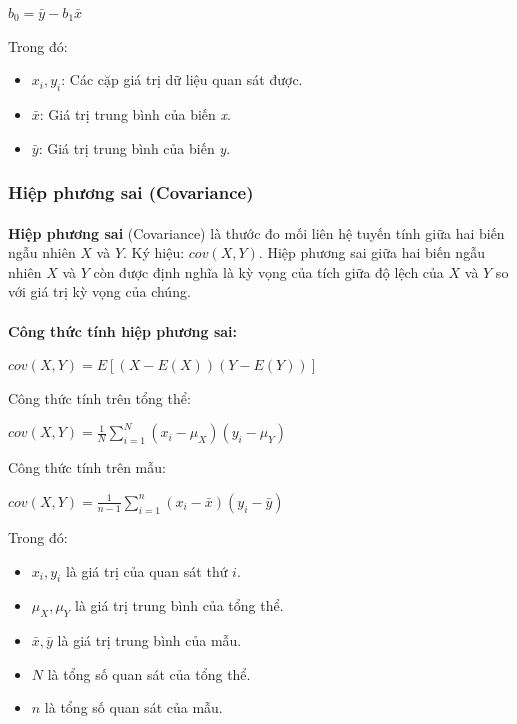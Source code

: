 \begin{center}
\large $b_0 = \bar{y} - b_1\bar{x}$
\end{center}

Trong đó:

\begin{itemize}
    \item \textbf{$x_i, y_i$}: Các cặp giá trị dữ liệu quan sát được.
    \item \textbf{$\bar{x}$}: Giá trị trung bình của biến \textit{x}.
    \item \textbf{$\bar{y}$}: Giá trị trung bình của biến \textit{y}.
\end{itemize}
\subsubsection{Hiệp phương sai (Covariance)}

\paragraph{}{\textbf{Hiệp phương sai} (Covariance) \cite{thongke-descriptive-statistics} là thước đo mối liên hệ tuyến tính giữa hai biến ngẫu nhiên $X$ và $Y$. Ký hiệu: $cov(X, Y)$. Hiệp phương sai giữa hai biến ngẫu nhiên $X$ và $Y$ còn được định nghĩa là kỳ vọng của tích giữa độ lệch của $X$ và $Y$ so với giá trị kỳ vọng của chúng.}

\paragraph{}{\textbf{Công thức tính hiệp phương sai:}}

\begin{center}
\large $cov(X, Y) = E[(X-E(X))(Y-E(Y))]$
\end{center}

Công thức tính trên tổng thể:
\begin{center}
\large $cov(X,Y) = \frac{1}{N} \sum_{i=1}^{N} (x_i - \mu_X)(y_i - \mu_Y)$
\end{center}

Công thức tính trên mẫu:
\begin{center}
\large $cov(X,Y) = \frac{1}{n-1} \sum_{i=1}^{n} (x_i - \bar{x})(y_i - \bar{y})$
\end{center}

Trong đó:
\begin{itemize}
    \item \( x_i, y_i \) là giá trị của quan sát thứ \(i\).
    \item \( \mu_X, \mu_Y \) là giá trị trung bình của tổng thể.
    \item \( \bar{x}, \bar{y} \) là giá trị trung bình của mẫu.
    \item \( N \) là tổng số quan sát của tổng thể.
    \item \( n \) là tổng số quan sát của mẫu.
\end{itemize}
